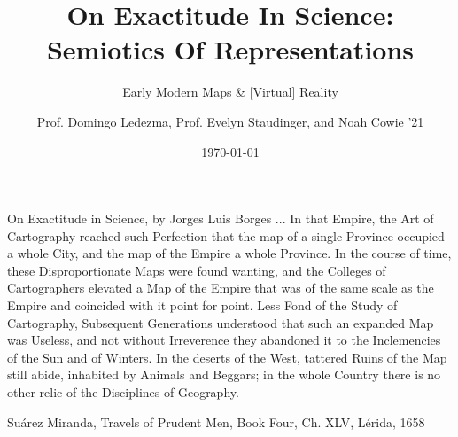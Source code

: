 \documentclass{beamer}
\title{On Exactitude In Science: Semiotics Of Representations}
\subtitle{Early Modern Maps \& [Virtual] Reality}
\author{Prof. Domingo Ledezma, Prof. Evelyn Staudinger, and Noah Cowie '21}
\date{\today}
\begin{document}
\maketitle

{
	
}

\begin{frame}{On Exactitude in Science, by Jorges Luis Borges}
	... In that Empire, the Art of Cartography reached such Perfection that the map of a single
	Province occupied a whole City, and the map of the Empire a whole Province. In the course
	of time, these Disproportionate Maps were found wanting, and the Colleges of Cartographers
	elevated a Map of the Empire that was of the same scale as the Empire and coincided with it
	point for point. Less Fond of the Study of Cartography, Subsequent Generations understood
	that such an expanded Map was Useless, and not without Irreverence they abandoned it to the
	Inclemencies of the Sun and of Winters. In the deserts of the West, tattered Ruins of the Map
	still abide, inhabited by Animals and Beggars; in the whole Country there is no other relic of
	the Disciplines of Geography.\par

	\hfill Su\'arez Miranda, Travels of Prudent Men, Book Four, Ch. XLV, L\'erida, 1658\par
\end{frame}
\end{document}
